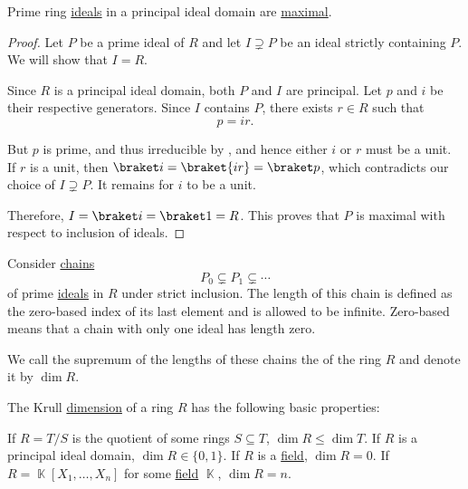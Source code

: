 \begin{proposition}\label{thm:prime_ideals_are_maximal_in_pid}
  Prime ring \hyperref[def:prime_ring_ideal]{ideals} in a principal ideal domain are \hyperref[def:maximal_ring_ideal]{maximal}.
\end{proposition}
\begin{proof}
  Let \( P \) be a prime ideal of \( R \) and let \( I \supsetneq P \) be an ideal strictly containing \( P \). We will show that \( I = R \).

  Since \( R \) is a principal ideal domain, both \( P \) and \( I \) are principal. Let \( p \) and \( i \) be their respective generators. Since \( I \) contains \( P \), there exists \( r \in R \) such that
  \begin{equation*}
    p = ir.
  \end{equation*}

  But \( p \) is prime, and thus irreducible by , and hence either \( i \) or \( r \) must be a unit. If \( r \) is a unit, then \( \braket i = \braket {ir} = \braket p \), which contradicts our choice of \( I \supsetneq P \). It remains for \( i \) to be a unit.

  Therefore, \( I = \braket i = \braket 1 = R \). This proves that \( P \) is maximal with respect to inclusion of ideals.
\end{proof}

\begin{definition}\label{def:krull_dimension}
  Consider \hyperref[ex:tower_diagram_graph]{chains}
  \begin{equation*}
    P_0 \subsetneq P_1 \subsetneq \cdots
  \end{equation*}
  of prime \hyperref[def:prime_ring_ideal]{ideals} in \( R \) under strict inclusion. The length of this chain is defined as the zero-based index of its last element and is allowed to be infinite. Zero-based means that a chain with only one ideal has length zero.

  We call the supremum of the lengths of these chains the  of the ring \( R \) and denote it by \( \dim R \).
\end{definition}

\begin{proposition}\label{thm:def:krull_dimension/properties}
  The Krull \hyperref[def:krull_dimension]{dimension} of a ring \( R \) has the following basic properties:
  \begin{thmenum}
     If \( R = T / S \) is the quotient of some rings \( S \subseteq T \), \( \dim R \leq \dim T \).
     If \( R \) is a principal ideal domain, \( \dim R \in \{ 0, 1 \} \).
     If \( R \) is a \hyperref[def:field]{field}, \( \dim R = 0 \).
    \cite[exercise 8.19]{КоцевСидеров2016} If \( R = \BbbK[X_1, \ldots, X_n] \) for some \hyperref[def:field]{field} \( \BbbK \), \( \dim R = n \).
  \end{thmenum}
\end{proposition}

